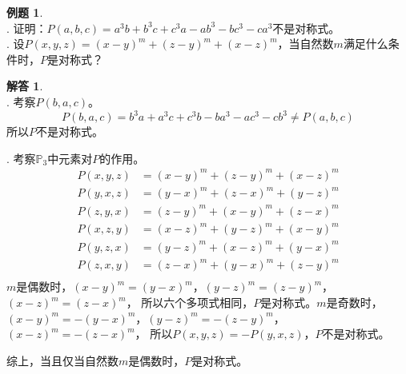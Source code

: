 \documentclass[12pt,UTF8]{ctexbook}
\newcommand{\dlim}[1]{^{\color{gray}\prime}#1}
\theoremstyle{definition}
\newtheorem{et}{例题}[section]
\newtheorem*{so}{解答}
\theoremstyle{plain}
\begin{document}
\begin{et}
    \mbox{} \\
    . 证明：$P(a, b, c) = a^3b + b^3c + c^3a - ab^3 - bc^3 - ca^3$不是对称式。\\
    . 设$P(x, y, z) = (x - y)^m + (z - y)^m + (x - z)^m$，当自然数$m$满足什么条件时，$P$是对称式？\\
\end{et}

\begin{so}
    \mbox{} \\
    . 考察$P(b, a, c)$。
    $$  P(b, a, c) = b^3a + a^3c + c^3b - ba^3 - ac^3 - cb^3 \neq P(a, b, c) $$
    所以$P$不是对称式。

    . 考察$\mathbb{P}_3$中元素对$P$的作用。
    \begin{align*}
        P(x, y, z) &= (x - y)^m + (z - y)^m + (x - z)^m \\
        P(y, x, z) &= (y - x)^m + (z - x)^m + (y - z)^m \\
        P(z, y, x) &= (z - y)^m + (x - y)^m + (z - x)^m \\
        P(x, z, y) &= (x - z)^m + (y - z)^m + (x - y)^m \\
        P(y, z, x) &= (y - z)^m + (x - z)^m + (y - x)^m \\
        P(z, x, y) &= (z - x)^m + (y - x)^m + (z - y)^m \\
    \end{align*}
    $m$是偶数时，$(x - y)^m = (y - x)^m$，$(y - z)^m = (z - y)^m$，$(x - z)^m = (z - x)^m$，
    所以六个多项式相同，$P$是对称式。$m$是奇数时，$(x - y)^m = -(y - x)^m$，$(y - z)^m = -(z - y)^m$，$(x - z)^m = -(z - x)^m$，
    所以$P(x, y, z) = -P(y, x, z) $，$P$不是对称式。

    综上，当且仅当自然数$m$是偶数时，$P$是对称式。
\end{so}


\end{document}
